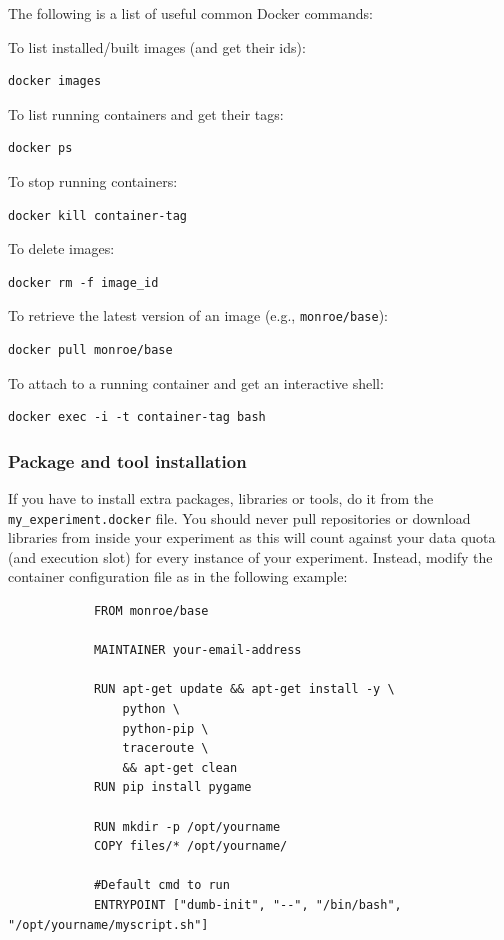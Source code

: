 \documentclass[a4paper,10pt]{article}
\newcommand{\VerbatimFont}{\footnotesize}
\newcommand{\identifier}[1]{{\texttt{\small{#1}}}}
\begin{document}
The following is a list of useful common Docker commands:
\begin{itemize*}
	\item To list installed/built images (and get their ids):
	\begin{verbatim}docker images\end{verbatim}
	\item To list running containers and get their tags:
	\begin{verbatim}docker ps\end{verbatim}
	\item To stop running containers:
	\begin{verbatim}docker kill container-tag\end{verbatim}
	\item To delete images:
	\begin{verbatim}docker rm -f image_id\end{verbatim}
	\item To retrieve the latest version of an image (e.g., \identifier{monroe/base}):
	\begin{verbatim}docker pull monroe/base\end{verbatim}
	\item To attach to a running container and get an interactive shell:
	\begin{verbatim}docker exec -i -t container-tag bash\end{verbatim}
\end{itemize*}

\subsubsection{Package and tool installation}
\label{subsubsec:packagesInstallation}

If you have to install extra packages, libraries or tools, do it from the \identifier{my\_experiment.docker} file.
You should never pull repositories or download libraries from inside your experiment as this will count against your data quota (and execution slot) for every instance of your experiment.
Instead, modify the container configuration file as in the following example:
{\VerbatimFont\begin{verbatim}
			FROM monroe/base
			
			MAINTAINER your-email-address
			
			RUN apt-get update && apt-get install -y \
			    python \
			    python-pip \
			    traceroute \
			    && apt-get clean
			RUN pip install pygame
			
			RUN mkdir -p /opt/yourname
			COPY files/* /opt/yourname/
			
			#Default cmd to run
			ENTRYPOINT ["dumb-init", "--", "/bin/bash", "/opt/yourname/myscript.sh"]
\end{verbatim}}
\end{document}
